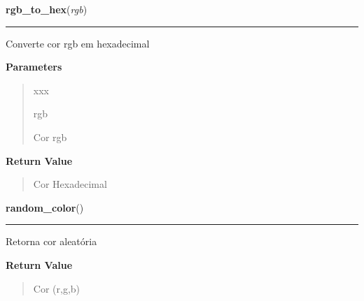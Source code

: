 \hspace{.8\funcindent}\begin{boxedminipage}{\funcwidth}

    \raggedright \textbf{rgb\_to\_hex}(\textit{rgb})

    \vspace{-1.5ex}

    \rule{\textwidth}{0.5\fboxrule}
\setlength{\parskip}{2ex}
    Converte cor rgb em hexadecimal

\setlength{\parskip}{1ex}
      \textbf{Parameters}
      \vspace{-1ex}

      \begin{quote}
        \begin{Ventry}{xxx}

          \item[rgb]

          Cor rgb

        \end{Ventry}

      \end{quote}

      \textbf{Return Value}
    \vspace{-1ex}

      \begin{quote}
      Cor Hexadecimal

      \end{quote}

    \end{boxedminipage}

    \label{pygame-asteroids:color:Color:random_color}

    \vspace{0.5ex}

\hspace{.8\funcindent}\begin{boxedminipage}{\funcwidth}

    \raggedright \textbf{random\_color}()

    \vspace{-1.5ex}

    \rule{\textwidth}{0.5\fboxrule}
\setlength{\parskip}{2ex}
    Retorna cor aleatória

\setlength{\parskip}{1ex}
      \textbf{Return Value}
    \vspace{-1ex}

      \begin{quote}
      Cor (r,g,b)

      \end{quote}

    \end{boxedminipage}

